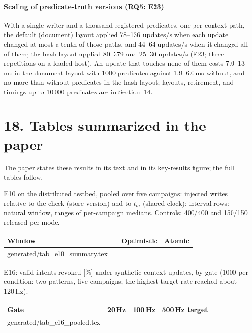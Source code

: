 \documentclass[11pt]{article}
\makeatletter
\newcommand{\gen}[1]{\@@input generated/#1.tex }
\makeatother
\begin{document}
\paragraph{Scaling of predicate-truth versions (RQ5: E23)}
With a single writer and a thousand registered predicates, one per context path, the default (document) layout applied 78--136 updates/s when each update changed at most a tenth of those paths, and 44--64 updates/s when it changed all of them; the hash layout applied 80--379 and 25--30 updates/s (E23; three repetitions on a loaded host). An update that touches none of them costs 7.0--13\,ms in the document layout with 1000 predicates against 1.9--6.0\,ms without, and no more than without predicates in the hash layout; layouts, retirement, and timings up to 10\,000 predicates are in Section~14.

\section*{18. Tables summarized in the paper}
The paper states these results in its text and in its key-results figure; the full tables follow.

\noindent E10 on the distributed testbed, pooled over five campaigns: injected writes relative to the check (store version) and to $t_m$ (shared clock); interval rows: natural window, ranges of per-campaign medians. Controls: 400/400 and 150/150 released per mode.
\begin{center}\small\setlength{\tabcolsep}{3pt}
\begin{tabular}{@{}llcc@{}}
\toprule
\textbf{Window} & & \textbf{Optimistic} & \textbf{Atomic} \\
\midrule
\gen{tab_e10_summary}
\bottomrule
\end{tabular}
\end{center}

\noindent E16: valid intents revoked [\%] under synthetic context updates, by gate (1000 per condition: two patterns, five campaigns; the highest target rate reached about 120\,Hz).
\begin{center}\small
\begin{tabular}{@{}lccc@{}}
\toprule
\textbf{Gate} & \textbf{20\,Hz} & \textbf{100\,Hz} & \textbf{500\,Hz target} \\
\midrule
\gen{tab_e16_pooled}
\bottomrule
\end{tabular}
\end{center}
\end{document}
